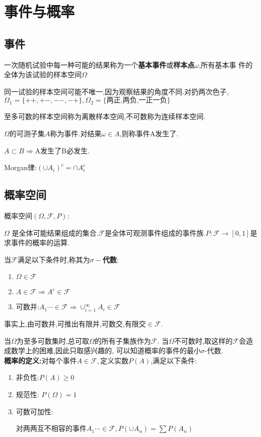 
\section{事件与概率}
\subsection{事件}
一次随机试验中每一种可能的结果称为一个{\bf 基本事件}或{\bf 样本点$ \omega$},所有基本事
件的全体为该试验的样本空间$ \Omega$

同一试验的样本空间可能不唯一,因为观察结果的角度不同.对扔两次色子,$ \Omega_1 =
\{++,+-,--,-+\}, \Omega_2 = \{\texttt{两正,两负,一正一负}\}$

至多可数的样本空间称为离散样本空间,不可数称为连续样本空间.

$ \Omega$的可测子集$ A$称为事件.对结果$ \omega \in A$,则称事件A发生了.

$ A \subset B \Rightarrow $A发生了B必发生.

Morgan律:$ (\cup A_i)^c = \cap A_i^c$

\subsection{概率空间}

概率空间$ (\Omega, \mathcal{F}, P)$:

$\Omega$ 是全体可能结果组成的集合.$ \mathcal{F}$是全体可观测事件组成的事件族.$ P:\mathcal{F} \rightarrow [0,1]$是求事件的概率的运算.

当$ \mathcal{F}$满足以下条件时,称其为{\bf $ \sigma -$代数}:
\begin{enumerate}
	\item $ \Omega \in \mathcal{F}$
	\item $ A\in \mathcal{F} \Rightarrow A^c \in \mathcal{F}$
	\item 可数并:$ A_1 \cdots \in \mathcal{F} \Rightarrow  \cup_{i = 1}^{\infty}{A_i}
		\in \mathcal{F}$
\end{enumerate}
事实上,由可数并,可推出有限并,可数交,有限交$ \in \mathcal{F}$.

当$ \Omega$为至多可数集时,总可取$ \Omega$的所有子集族作为$ \mathcal{F}$.
当$ \Omega$不可数时,取这样的$ \mathcal{F}$会造成数学上的困难,因此只取感兴趣的,
可以知道概率的事件的最小$ \sigma$-代数.
\\

{\bf 概率的定义:}对每个事件$ A\in \mathcal{F},$定义实数$ P(A)$,满足以下条件:
\begin{enumerate}
	\item 非负性:$ P(A) \ge 0$
	\item 规范性: $ P(\Omega) = 1$
	\item 可数可加性:

		对两两互不相容的事件$ A_1 \cdots \in \mathcal{F}, P(\cup{A_n}) =
		\sum{P(A_n)}$
\end{enumerate}

